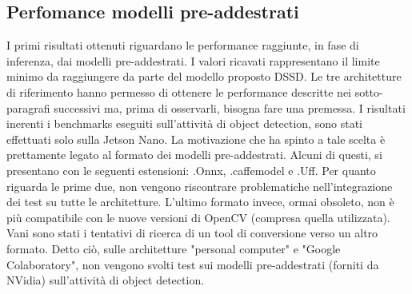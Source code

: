 \subsection{Perfomance modelli pre-addestrati}
I primi risultati ottenuti riguardano le performance raggiunte, in fase di inferenza, dai modelli pre-addestrati. I valori ricavati rappresentano il limite minimo da raggiungere da parte del modello proposto DSSD. Le tre architetture di riferimento hanno permesso di ottenere le performance descritte nei sotto-paragrafi successivi ma, prima di osservarli, bisogna fare una premessa. 
I risultati inerenti i benchmarks eseguiti sull'attività di object detection, sono stati effettuati solo sulla Jetson Nano. La motivazione che ha spinto a tale scelta è prettamente legato al formato dei modelli pre-addestrati.
Alcuni di questi, si presentano con le seguenti estensioni: .Onnx, .caffemodel e .Uff. Per quanto riguarda le prime due, non vengono riscontrare problematiche nell'integrazione dei test su tutte le architetture. 
L'ultimo formato invece, ormai obsoleto, non è più compatibile con le nuove versioni di OpenCV (compresa quella utilizzata). Vani sono stati i tentativi di ricerca di un tool di conversione verso un altro formato.
Detto ciò, sulle architetture "personal computer" e "Google Colaboratory", non vengono svolti test sui modelli pre-addestrati (forniti da NVidia) sull'attività di object detection.


